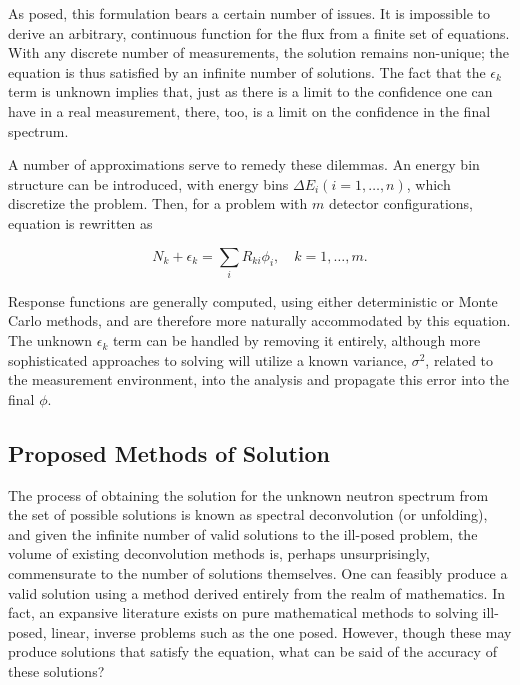 As posed, this formulation bears a certain number of issues.
It is impossible to derive an arbitrary, continuous function for the flux from a finite set of equations.
With any discrete number of measurements, the solution remains non-unique; the equation is thus satisfied by an infinite number of solutions.
The fact that the $\epsilon_k$ term is unknown implies that, just as there is a limit to the confidence one can have in a real measurement, there, too, is a limit on the confidence in the final spectrum.

A number of approximations serve to remedy these dilemmas.
An energy bin structure can be introduced, with energy bins $\Delta E_i (i = 1, \ldots, n)$, which discretize the problem.
Then, for a problem with $m$ detector configurations, equation  is rewritten as

\begin{equation}
\label{eqn:disc-response}
N_k + \epsilon_k = \sum_i R_{ki} \phi_i, \quad k = 1,\ldots, m .
\end{equation}

Response functions are generally computed, using either deterministic or Monte Carlo methods, and are therefore more naturally accommodated by this equation.
The unknown $\epsilon_k$ term can be handled by removing it entirely, although more sophisticated approaches to solving will utilize a known variance, $\sigma^2$, related to the measurement environment, into the analysis and propagate this error into the final $\phi$.


\subsection{Proposed Methods of Solution}

The process of obtaining the solution for the unknown neutron spectrum from the set of possible solutions is known as spectral deconvolution (or unfolding), and given the infinite number of valid solutions to the ill-posed problem, the volume of existing deconvolution methods is, perhaps unsurprisingly, commensurate to the number of solutions themselves.
One can feasibly produce a valid solution using a method derived entirely from the realm of mathematics.
In fact, an expansive literature exists on pure mathematical methods to solving ill-posed, linear, inverse problems such as the one posed.
However, though these may produce solutions that satisfy the equation, what can be said of the accuracy of these solutions?

